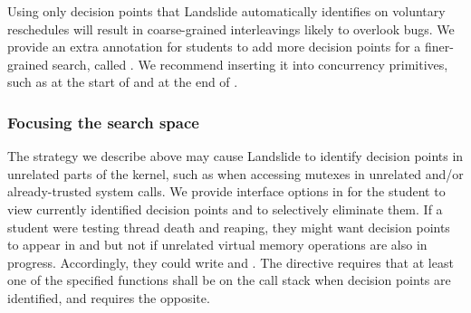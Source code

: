 Using only decision points that Landslide automatically identifies on voluntary reschedules will result in coarse-grained interleavings likely to overlook bugs.
We provide an extra annotation
for students to add more decision points for a finer-grained search, called
.
We recommend inserting it into concurrency primitives, such as at the start of  and at the end of .

\subsubsection{Focusing the search space}
\label{sec:focusing}

The strategy we describe above may cause Landslide to identify decision points in unrelated parts of the kernel, such as when accessing mutexes in unrelated and/or already-trusted system calls.
We provide interface options in  for the student to view currently identified decision points and to selectively eliminate them.
If a student were testing thread death and reaping, they might want decision points to appear in  and  but not if unrelated virtual memory operations are also in progress.
Accordingly, they could write  and  .
The  directive requires that at least one of the specified functions shall be on the call stack when decision points are identified, and  requires the opposite.


